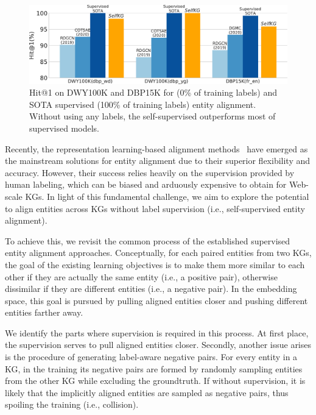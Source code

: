 \begin{figure}[t]
\setlength{\abovecaptionskip}{-0.2mm}
\centering   
\includegraphics[width=\columnwidth]{img/intro.pdf}
\vspace{-1.5mm}
\caption{Hit@1 on DWY100K and DBP15K for \solution (0\% of training labels) and SOTA supervised (100\% of training labels) entity alignment. \textmd{Without using any labels, the self-supervised \solution outperforms most of supervised models.}}
\label{fig:intro}
\vspace{-3.5mm}
\end{figure}

Recently, the representation learning-based alignment methods~\cite{MTransE,GCN-Align,CEAFF,tang2019bert-int,wu2019relation} have emerged as the mainstream solutions for entity alignment due to their superior flexibility and accuracy. 
However, their success relies heavily on the supervision provided by human labeling, which can be biased and arduously expensive to obtain for Web-scale KGs. 
In light of this fundamental challenge, we aim to explore the potential to align entities across KGs without label supervision (i.e., self-supervised entity alignment). 

To achieve this, we revisit the common process of the established supervised entity alignment approaches. 
Conceptually, for each paired entities from two KGs, the goal of the existing learning objectives is to make them more similar to each other if they are actually the same entity (i.e., a positive pair), otherwise dissimilar if they are different entities (i.e., a negative pair). 
In the embedding space, this goal is pursued by pulling aligned entities closer and pushing different entities farther away.


We identify the parts where supervision is required in this process. At first place, the supervision serves to pull aligned entities closer.
Secondly, another issue arises is the procedure of generating label-aware negative pairs. 
For every entity in a KG, in the training its negative pairs are formed by randomly sampling entities from the other KG while excluding the groundtruth. 
If without supervision, it is likely that the implicitly aligned entities are sampled as negative pairs, thus spoiling the training (i.e., collision).


